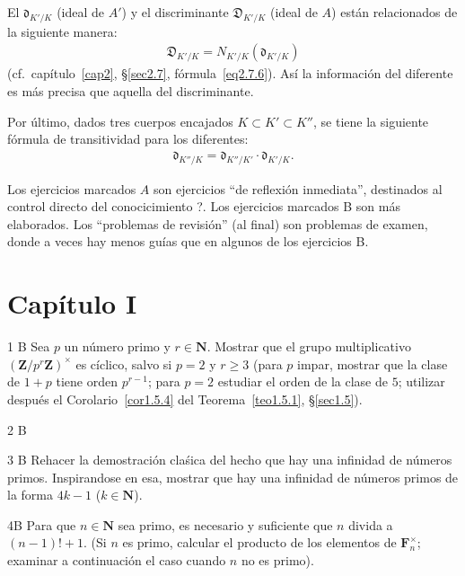\documentclass[10pt,oneside,bibtotoc,smallheadings,leqno,a5paper,DIV=12]{scrbook}
\newcommand{\ZZ}{\mathbf{Z}}
\newcommand{\NN}{\mathbf{N}}
\newcommand{\FF}{\mathbf{F}}
\newcommand{\disc}{\mathfrak{D}}
\newcommand{\diff}{\mathfrak{d}}
\numberwithin{equation}{section}
\theoremstyle{defi}
\newcommand{\exername}{}
\newtheorem*{namedexer}{\exername}
\newenvironment{exer*}[1]{\renewcommand{\exername}{#1}\begin{namedexer}}{\end{namedexer}}
\theoremstyle{enonce}
\theoremstyle{rem}
\numberwithin{theorem}{section}
\numberwithin{proposition}{section}
\numberwithin{definition}{section}
\numberwithin{lemma}{section}
\numberwithin{corollary}{section}
\numberwithin{example}{section}
\numberwithin{footnote}{section}%
\begin{document}
El  $\diff_{K'/K}$ (ideal de $A'$) y el discriminante $\disc_{K'/K}$ (ideal de $A$) est\'an relacionados
de la siguiente manera:
\begin{gather}
\disc_{K'/K}=N_{K'/K}(\diff_{K'/K})
\end{gather}
(cf.~cap\'itulo~\ref{cap2}, \S\ref{sec2.7}, f\'ormula~\eqref{eq2.7.6}). As\'i la informaci\'on del diferente es m\'as
precisa que aquella del discriminante.

Por \'ultimo, dados tres cuerpos encajados $K\subset K'\subset K''$, se tiene la siguiente f\'ormula de transitividad
para los diferentes:
\begin{gather}
\diff_{K''/K} = \diff_{K''/K'}\cdot\diff_{K'/K}.
\end{gather}


Los ejercicios marcados $A$ son ejercicios ``de reflexi\'on inmediata'', destinados al
control directo del conocicimiento ?. Los ejercicios marcados B son m\'as elaborados. Los
``problemas de revisi\'on'' (al final) son problemas de examen, donde a veces hay menos gu\'ias
que en algunos de los ejercicios B.

\section*{Cap\'itulo I}

\begin{exer*}{1 B}
Sea $p$ un n\'umero primo y $r\in\NN$. Mostrar que el grupo multiplicativo
$(\ZZ/p^r\ZZ)^\times$ es c\'iclico, salvo si $p=2$ y $r\geq 3$ (para $p$ impar,
mostrar que la clase de $1+p$ tiene orden $p^{r-1}$; para $p=2$ estudiar el orden
de la clase de $5$; utilizar despu\'es el Corolario~\ref{cor1.5.4} del Teorema~\ref{teo1.5.1},
\S\ref{sec1.5}).
\end{exer*}

\begin{exer*}{2 B}
\end{exer*}

\begin{exer*}{3 B}
Rehacer la demostraci\'on cla\'sica del hecho que hay una infinidad de n\'umeros primos. Inspirandose
en esa, mostrar que hay una infinidad de n\'umeros primos de la forma $4k-1$ ($k\in\NN$).
\end{exer*}

\begin{exer*}{4B}
Para que $n\in\NN$ sea primo, es necesario y suficiente que $n$ divida a
$(n-1)!+1$. (Si $n$ es primo, calcular el producto de los elementos de $\FF_n^\times$;
examinar a continuaci\'on el caso cuando $n$ no es primo).
\end{exer*}
\end{document}

